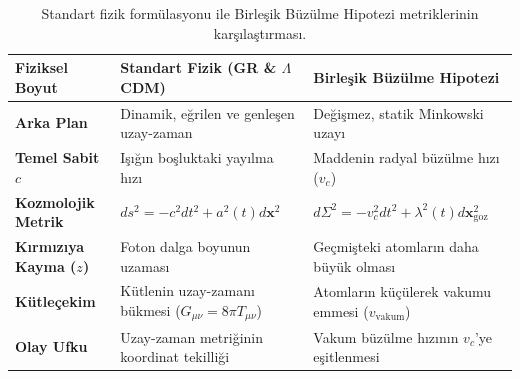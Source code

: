 \begin{table}[h!]
    \centering
    \small
    \begin{tabular}{@{}lll@{}}
        \toprule
        \textbf{Fiziksel Boyut}        & \textbf{Standart Fizik (GR \& $\Lambda$CDM)}                  & \textbf{Birleşik Büzülme Hipotezi}                                    \\ \midrule
        \textbf{Arka Plan}             & Dinamik, eğrilen ve genleşen uzay-zaman                       & Değişmez, statik Minkowski uzayı                                      \\
        \textbf{Temel Sabit $c$}       & Işığın boşluktaki yayılma hızı                                & Maddenin radyal büzülme hızı ($v_c$)                                  \\
        \textbf{Kozmolojik Metrik}     & $ds^2 = -c^2 dt^2 + a^2(t) d\mathbf{x}^2$                     & $d\Sigma^2 = -v_c^2 dt^2 + \lambda^2(t) d\mathbf{x}_{\mathrm{goz}}^2$ \\
        \textbf{Kırmızıya Kayma ($z$)} & Foton dalga boyunun uzaması                                   & Geçmişteki atomların daha büyük olması                                \\
        \textbf{Kütleçekim}            & Kütlenin uzay-zamanı bükmesi ($G_{\mu\nu} = 8\pi T_{\mu\nu}$) & Atomların küçülerek vakumu emmesi ($v_{\mathrm{vakum}}$)              \\
        \textbf{Olay Ufku}             & Uzay-zaman metriğinin koordinat tekilliği                     & Vakum büzülme hızının $v_c$'ye eşitlenmesi                            \\ \bottomrule
    \end{tabular}
    \caption{Standart fizik formülasyonu ile Birleşik Büzülme Hipotezi metriklerinin karşılaştırması.}
    \label{tab:metrik_karsilastirma}
\end{table}

